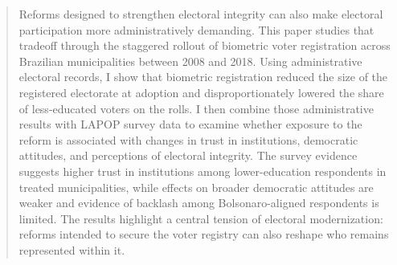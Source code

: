 \begin{abstract}
Reforms designed to strengthen electoral integrity can also make electoral participation more administratively demanding. This paper studies that tradeoff through the staggered rollout of biometric voter registration across Brazilian municipalities between 2008 and 2018. Using administrative electoral records, I show that biometric registration reduced the size of the registered electorate at adoption and disproportionately lowered the share of less-educated voters on the rolls. I then combine those administrative results with LAPOP survey data to examine whether exposure to the reform is associated with changes in trust in institutions, democratic attitudes, and perceptions of electoral integrity. The survey evidence suggests higher trust in institutions among lower-education respondents in treated municipalities, while effects on broader democratic attitudes are weaker and evidence of backlash among Bolsonaro-aligned respondents is limited. The results highlight a central tension of electoral modernization: reforms intended to secure the voter registry can also reshape who remains represented within it.
\end{abstract}
